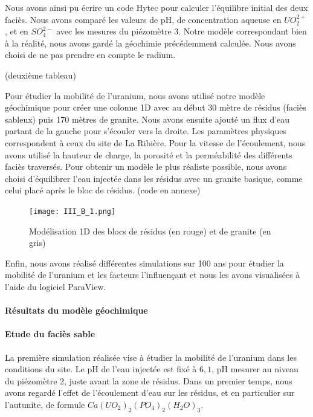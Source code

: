 \documentclass{article}
\begin{document}
Nous avons ainsi pu écrire un code Hytec pour calculer l’équilibre initial des deux faciès. Nous avons comparé les valeurs de pH, de concentration aqueuse en $UO_2^{2+}$, et en $SO_4^{2-}$ avec les mesures du piézomètre 3. Notre modèle correspondant bien à la réalité, nous avons gardé la géochimie précédemment calculée. Nous avons choisi de ne pas prendre en compte le radium.
	
	(deuxième tableau)
	
Pour étudier la mobilité de l’uranium, nous avons utilisé notre modèle géochimique pour créer une colonne 1D avec au début 30 mètre de résidus (faciès sableux) puis 170 mètres de granite. Nous avons ensuite ajouté un flux d’eau partant de la gauche pour s’écouler vers la droite. Les paramètres physiques correspondent à ceux du site de La Ribière. Pour la vitesse de l’écoulement, nous avons utilisé la hauteur de charge, la porosité et la perméabilité des différents faciès traversés. Pour obtenir un modèle le plus réaliste possible, nous avons choisi d’équilibrer l’eau injectée dans les résidus avec un granite basique, comme celui placé après le bloc de résidus. (code en annexe)


\begin{figure}[H]
    \centering
    \texttt{[image: III\_B\_1.png]}
    \caption{Modélisation 1D des blocs de résidus (en rouge) et de granite (en gris)}
    \label{fig:modele_bloc}
\end{figure}

Enfin, nous avons réalisé différentes simulations sur 100 ans pour étudier la mobilité de l’uranium et les facteurs l’influençant et nous les avons visualisées à l’aide du logiciel ParaView.


\paragraph{Résultats du modèle géochimique }
\paragraph{Etude du faciès sable}

La première simulation réalisée vise à étudier la mobilité de l’uranium dans les conditions du site. Le pH de l’eau injectée est fixé à $6,1$, pH mesurer au niveau du piézomètre 2, juste avant la zone de résidus. Dans un premier temps, nous avons regardé l’effet de l’écoulement d’eau sur les résidus, et en particulier sur l’autunite, de formule $Ca(UO_2)_2(PO_4)_2(H_2O)_3$.
\end{document}

